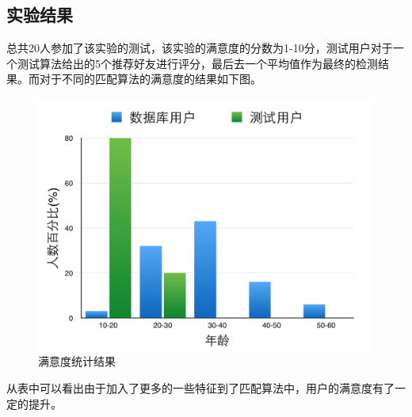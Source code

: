 \subsection{实验结果}
总共20人参加了该实验的测试，该实验的满意度的分数为1-10分，测试用户对于一个测试算法给出的5个推荐好友进行评分，最后去一个平均值作为最终的检测结果。而对于不同的匹配算法的满意度的结果如下图。
\begin{figure}[h]
\begin{minipage}[t]{1\linewidth} 
\centering
\includegraphics[width=\textwidth]{img/chap5/exp1.png}
\caption{满意度统计结果\label{instagram}}
\end{minipage}
\end{figure}
从表中可以看出由于加入了更多的一些特征到了匹配算法中，用户的满意度有了一定的提升。



